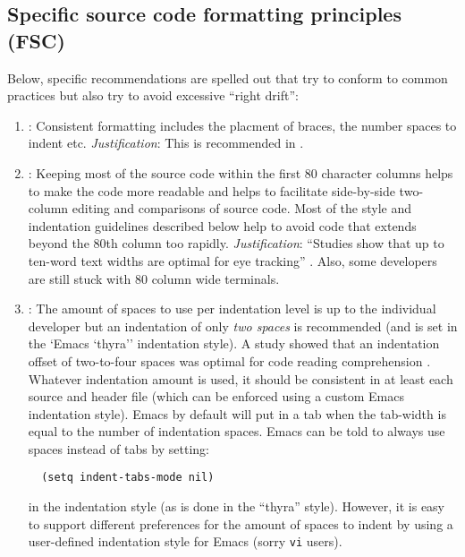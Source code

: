 %
\subsection{Specific source code formatting principles (FSC)}
%

Below, specific recommendations are spelled out that try to conform to common
practices but also try to avoid excessive ``right drift'':

\begin{enumerate}

{}\item\FSCConsistentInFile: Consistent formatting includes the placment of
braces, the number spaces to indent etc.  {}\textit{Justification}: This is
recommended in {}\cite[Item 0]{C++CodingStandards05}.

{}\item\FSCEightyCharWide: Keeping most of the source code within the first 80
character columns helps to make the code more readable and helps to facilitate
side-by-side two-column editing and comparisons of source code.  Most of the
style and indentation guidelines described below help to avoid code that
extends beyond the 80th column too rapidly. {}\textit{Justification}:
``Studies show that up to ten-word text widths are optimal for eye tracking''
{}\cite[Item 0]{C++CodingStandards05}.  Also, some developers are still stuck
with 80 column wide terminals.

{}\item\FSCIndentSpaces: The amount of spaces to use per indentation level is
up to the individual developer but an indentation of only {}\textit{two
spaces} is recommended (and is set in the `Emacs `thyra'' indentation style).
A study showed that an indentation offset of two-to-four spaces was optimal
for code reading comprehension {}\cite[Section 31.2]{CodeComplete2nd04}.
Whatever indentation amount is used, it should be consistent in at least each
source and header file {}\cite[Item 0]{C++CodingStandards05} (which can be
enforced using a custom Emacs indentation style).  Emacs by default will put
in a tab when the tab-width is equal to the number of indentation spaces.
Emacs can be told to always use spaces instead of tabs by setting:

{\small\begin{verbatim}
  (setq indent-tabs-mode nil)
\end{verbatim}}

in the indentation style (as is done in the ``thyra'' style).  However, it is
easy to support different preferences for the amount of spaces to indent by
using a user-defined indentation style for Emacs (sorry {}\texttt{vi} users).


\end{enumerate}
